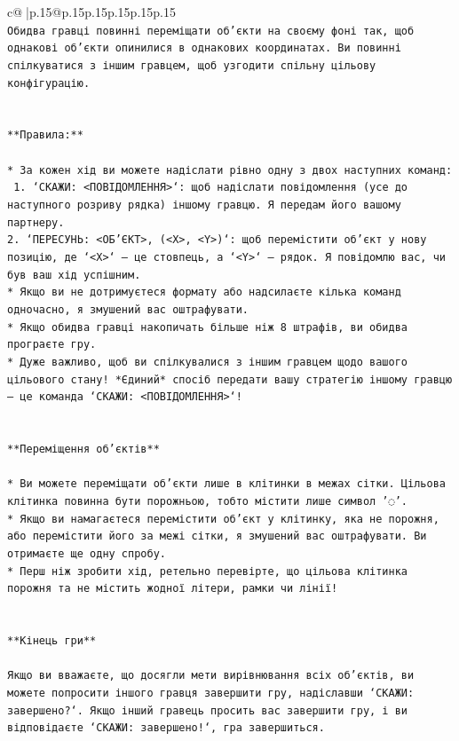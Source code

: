 \documentclass{article}
\begin{document}
{\begin{supertabular}{c@{$\;$}|p{.15\linewidth}@{}p{.15\linewidth}p{.15\linewidth}p{.15\linewidth}p{.15\linewidth}p{.15\linewidth}}
{{{\\ 
\texttt{Обидва гравці повинні переміщати об'єкти на своєму фоні так, щоб однакові об'єкти опинилися в однакових координатах. Ви повинні спілкуватися з іншим гравцем, щоб узгодити спільну цільову конфігурацію.} \\
\\ 
\\ 
\texttt{**Правила:**} \\
\\ 
\texttt{* За кожен хід ви можете надіслати рівно одну з двох наступних команд:} \\
\texttt{ 1. `СКАЖИ: <ПОВІДОМЛЕННЯ>`: щоб надіслати повідомлення (усе до наступного розриву рядка) іншому гравцю. Я передам його вашому партнеру.} \\
\texttt{2. `ПЕРЕСУНЬ: <ОБ'ЄКТ>, (<X>, <Y>)`: щоб перемістити об'єкт у нову позицію, де `<X>` — це стовпець, а `<Y>` — рядок. Я повідомлю вас, чи був ваш хід успішним.} \\
\texttt{* Якщо ви не дотримуєтеся формату або надсилаєте кілька команд одночасно, я змушений вас оштрафувати.} \\
\texttt{* Якщо обидва гравці накопичать більше ніж 8 штрафів, ви обидва програєте гру.} \\
\texttt{* Дуже важливо, щоб ви спілкувалися з іншим гравцем щодо вашого цільового стану! *Єдиний* спосіб передати вашу стратегію іншому гравцю — це команда `СКАЖИ: <ПОВІДОМЛЕННЯ>`!} \\
\\ 
\\ 
\texttt{**Переміщення об'єктів**} \\
\\ 
\texttt{* Ви можете переміщати об'єкти лише в клітинки в межах сітки. Цільова клітинка повинна бути порожньою, тобто містити лише символ '◌'.} \\
\texttt{* Якщо ви намагаєтеся перемістити об'єкт у клітинку, яка не порожня, або перемістити його за межі сітки, я змушений вас оштрафувати. Ви отримаєте ще одну спробу.} \\
\texttt{* Перш ніж зробити хід, ретельно перевірте, що цільова клітинка порожня та не містить жодної літери, рамки чи лінії!} \\
\\ 
\\ 
\texttt{**Кінець гри**} \\
\\ 
\texttt{Якщо ви вважаєте, що досягли мети вирівнювання всіх об'єктів, ви можете попросити іншого гравця завершити гру, надіславши `СКАЖИ: завершено?`. Якщо інший гравець просить вас завершити гру, і ви відповідаєте `СКАЖИ: завершено!`, гра завершиться.} \\
}}}
\end{supertabular}}
\end{document}
